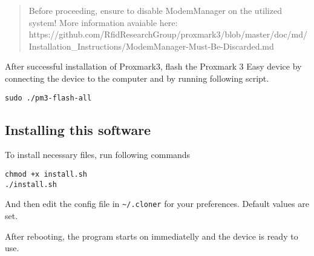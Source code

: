 \begin{quote}
Before proceeding, ensure to disable ModemManager on the utilized
system! More information avaiable here:
https://github.com/RfidResearchGroup/proxmark3/blob/master/doc/md/Installation\_Instructions/ModemManager-Must-Be-Discarded.md
\end{quote}

After successful installation of Proxmark3, flash the Proxmark 3 Easy
device by connecting the device to the computer and by running following
script.

\begin{verbatim}
sudo ./pm3-flash-all
\end{verbatim}

\subsection{Installing this software}\label{installing-this-software}

\begin{Shaded}
\begin{Highlighting}[]
\end{Highlighting}
\end{Shaded}

To install necessary files, run following commands

\begin{verbatim}
chmod +x install.sh
./install.sh
\end{verbatim}

And then edit the config file in \texttt{\textasciitilde{}/.cloner} for
your preferences. Default values are set.

After rebooting, the program starts on immediatelly and the device is
ready to use.

